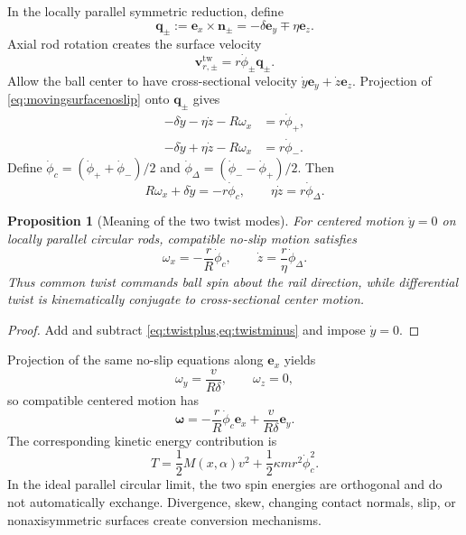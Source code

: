 \documentclass[11pt]{article}
\numberwithin{equation}{section}
\newtheorem{proposition}{Proposition}[section]
\theoremstyle{definition}
\theoremstyle{remark}
\begin{document}
In the locally parallel symmetric reduction, define
\begin{equation}
  \bm q_\pm:=\bm e_x\times\bm n_\pm
  =-\delta\bm e_y\mp\eta\bm e_z.
  \label{eq:qpm}
\end{equation}
Axial rod rotation creates the surface velocity
\begin{equation}
  \bm v^{\mathrm{tw}}_{r,\pm}
  =r\dot\phi_\pm\bm q_\pm.
  \label{eq:twistsurfacevelocity}
\end{equation}
Allow the ball center to have cross-sectional velocity
$\dot y\bm e_y+\dot z\bm e_z$.  Projection of \cref{eq:movingsurfacenoslip} onto $\bm q_\pm$ gives
\begin{align}
  -\delta\dot y-\eta\dot z-R\omega_x&=r\dot\phi_+,
  \label{eq:twistplus}\\
  -\delta\dot y+\eta\dot z-R\omega_x&=r\dot\phi_-.
  \label{eq:twistminus}
\end{align}
Define $\dot\phi_c=(\dot\phi_++\dot\phi_-)/2$ and
$\dot\phi_\Delta=(\dot\phi_- -\dot\phi_+)/2$.  Then
\begin{equation}
  R\omega_x+\delta\dot y=-r\dot\phi_c,
  \qquad
  \eta\dot z=r\dot\phi_\Delta.
  \label{eq:twistmodes}
\end{equation}

\begin{proposition}[Meaning of the two twist modes]
\label{prop:twistmodes}
For centered motion $\dot y=0$ on locally parallel circular rods, compatible no-slip motion satisfies
\begin{equation}
  \omega_x=-\frac rR\dot\phi_c,
  \qquad
  \dot z=\frac r\eta\dot\phi_\Delta.
  \label{eq:twistinterpretation}
\end{equation}
Thus common twist commands ball spin about the rail direction, while differential twist is kinematically conjugate to cross-sectional center motion.
\end{proposition}

\begin{proof}
Add and subtract \cref{eq:twistplus,eq:twistminus} and impose $\dot y=0$.
\end{proof}

Projection of the same no-slip equations along $\bm e_x$ yields
\begin{equation}
  \omega_y=\frac{v}{R\delta},
  \qquad \omega_z=0,
  \label{eq:twistlongitudinalspin}
\end{equation}
so compatible centered motion has
\begin{equation}
  \bm\omega
  =-\frac rR\dot\phi_c\bm e_x
   +\frac{v}{R\delta}\bm e_y.
  \label{eq:fullsymomega}
\end{equation}
The corresponding kinetic energy contribution is
\begin{equation}
  T
  =\frac12M(x,\alpha)v^2
   +\frac12\kappa mr^2\dot\phi_c^2.
  \label{eq:twistkineticenergy}
\end{equation}
In the ideal parallel circular limit, the two spin energies are orthogonal and do not automatically exchange.  Divergence, skew, changing contact normals, slip, or nonaxisymmetric surfaces create conversion mechanisms.
\end{document}
